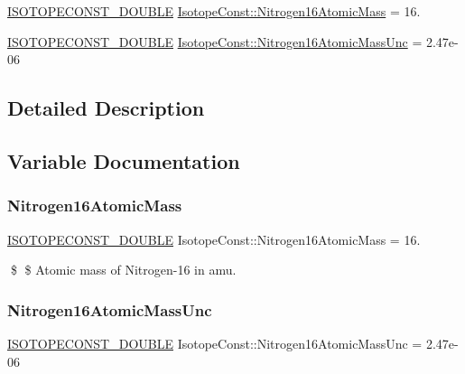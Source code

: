 \begin{DoxyCompactItemize}
\item 
\mbox{\hyperlink{group___isotope_const-_macros_ga8f45a7272ce02c0b4c65c44636ed719a}{I\+S\+O\+T\+O\+P\+E\+C\+O\+N\+S\+T\+\_\+\+D\+O\+U\+B\+LE}} \mbox{\hyperlink{group___isotope_const-_nitrogen-_n16_ga81a6d5dc16959915300c1243ff01ad05}{Isotope\+Const\+::\+Nitrogen16\+Atomic\+Mass}} = 16.
\item 
\mbox{\hyperlink{group___isotope_const-_macros_ga8f45a7272ce02c0b4c65c44636ed719a}{I\+S\+O\+T\+O\+P\+E\+C\+O\+N\+S\+T\+\_\+\+D\+O\+U\+B\+LE}} \mbox{\hyperlink{group___isotope_const-_nitrogen-_n16_ga1ad50433455b6b204363163ffdfe27ea}{Isotope\+Const\+::\+Nitrogen16\+Atomic\+Mass\+Unc}} = 2.\+47e-\/06
\end{DoxyCompactItemize}


\subsection{Detailed Description}


\subsection{Variable Documentation}
\mbox{\label{group___isotope_const-_nitrogen-_n16_ga81a6d5dc16959915300c1243ff01ad05}} 
\subsubsection{\texorpdfstring{Nitrogen16\+Atomic\+Mass}{Nitrogen16AtomicMass}}
{\footnotesize\ttfamily \mbox{\hyperlink{group___isotope_const-_macros_ga8f45a7272ce02c0b4c65c44636ed719a}{I\+S\+O\+T\+O\+P\+E\+C\+O\+N\+S\+T\+\_\+\+D\+O\+U\+B\+LE}} Isotope\+Const\+::\+Nitrogen16\+Atomic\+Mass = 16.}

\$ \$ Atomic mass of Nitrogen-\/16 in amu. \mbox{\label{group___isotope_const-_nitrogen-_n16_ga1ad50433455b6b204363163ffdfe27ea}} 
\subsubsection{\texorpdfstring{Nitrogen16\+Atomic\+Mass\+Unc}{Nitrogen16AtomicMassUnc}}
{\footnotesize\ttfamily \mbox{\hyperlink{group___isotope_const-_macros_ga8f45a7272ce02c0b4c65c44636ed719a}{I\+S\+O\+T\+O\+P\+E\+C\+O\+N\+S\+T\+\_\+\+D\+O\+U\+B\+LE}} Isotope\+Const\+::\+Nitrogen16\+Atomic\+Mass\+Unc = 2.\+47e-\/06}

